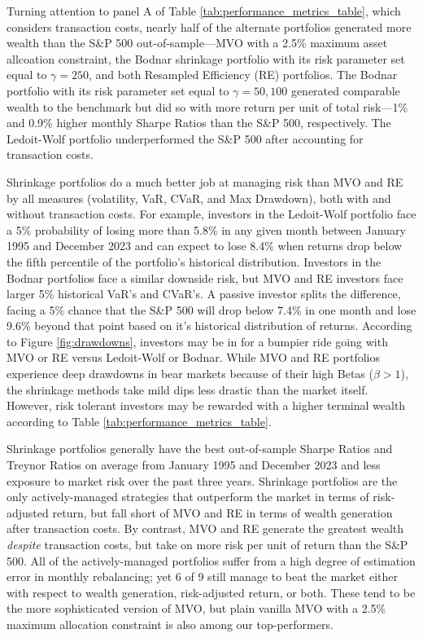 \documentclass[12pt,letterpaper]{article}
\begin{document}
Turning attention to panel A of Table \ref{tab:performance_metrics_table}, which considers transaction costs, nearly half of the alternate portfolios generated more wealth than the S\&P 500 out-of-sample---MVO with a 2.5\% maximum asset allcoation constraint, the Bodnar shrinkage portfolio with its risk parameter set equal to $\gamma=250$, and both Resampled Efficiency (RE) portfolios. The Bodnar portfolio with its risk parameter set equal to $\gamma={50,100}$ generated comparable wealth to the benchmark but did so with more return per unit of total risk---1\% and 0.9\% higher monthly Sharpe Ratios than the S\&P 500, respectively. The Ledoit-Wolf portfolio underperformed the S\&P 500 after accounting for transaction costs.

Shrinkage portfolios do a much better job at managing risk than MVO and RE by all measures (volatility, VaR, CVaR, and Max Drawdown), both with and without transaction costs. For example, investors in the Ledoit-Wolf portfolio face a 5\% probability of losing more than 5.8\% in any given month between January 1995 and December 2023 and can expect to lose 8.4\% when returns drop below the fifth percentile of the portfolio's historical distribution. Investors in the Bodnar portfolios face a similar downside risk, but MVO and RE investors face larger 5\% historical VaR's and CVaR's. A passive investor splits the difference, facing a 5\% chance that the S\&P 500 will drop below 7.4\% in one month and lose 9.6\% beyond that point based on it's historical distribution of returns. According to Figure \ref{fig:drawdowns}, investors may be in for a bumpier ride going with MVO or RE versus Ledoit-Wolf or Bodnar. While MVO and RE portfolios experience deep drawdowns in bear markets because of their high Betas ($\beta>1$), the shrinkage methods take mild dips less drastic than the market itself. However, risk tolerant investors may be rewarded with a higher terminal wealth according to Table \ref{tab:performance_metrics_table}.

Shrinkage portfolios generally have the best out-of-sample Sharpe Ratios and Treynor Ratios on average from January 1995 and December 2023 and less exposure to market risk over the past three years. Shrinkage portfolios are the only actively-managed strategies that outperform the market in terms of risk-adjusted return, but fall short of MVO and RE in terms of wealth generation after transaction costs. By contrast, MVO and RE generate the greatest wealth \textit{despite} transaction costs, but take on more risk per unit of return than the S\&P 500. All of the actively-managed portfolios suffer from a high degree of estimation error in monthly rebalancing; yet 6 of 9 still manage to beat the market either with respect to wealth generation, risk-adjusted return, or both. These tend to be the more sophisticated version of MVO, but plain vanilla MVO with a 2.5\% maximum allocation constraint is also among our top-performers.
\end{document}
